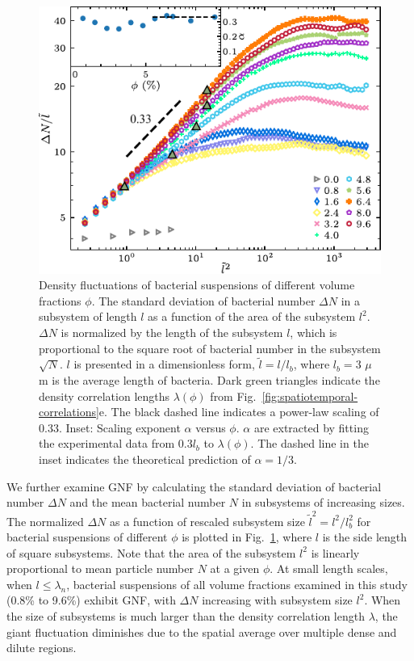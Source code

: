 \begin{figure}[!ht]
\begin{center}
\includegraphics[width=4.5in]{figs/5-GNF/4.pdf}
\caption[Giant Number Fluctuations in Active Turbulence]
{
Density fluctuations of bacterial suspensions of different volume fractions $\phi$. The standard deviation of bacterial number $\Delta N$ in a subsystem of length $l$ as a function of the area of the subsystem $l^2$. $\Delta N$ is normalized by the length of the subsystem $l$, which is proportional to the square root of bacterial number in the subsystem $\sqrt N$. $l$ is presented in a dimensionless form, $\tilde{l} = l/l_b$, where $l_b = 3$ $\mu$m is the average length of bacteria. Dark green triangles indicate the density correlation lengths $\lambda(\phi)$ from Fig.~\ref{fig:spatiotemporal-correlations}e. The black dashed line indicates a power-law scaling of 0.33.
Inset: Scaling exponent $\alpha$ versus $\phi$. $\alpha$ are extracted by fitting the experimental data from 0.3$l_b$ to $\lambda(\phi)$. The dashed line in the inset indicates the theoretical prediction of $\alpha=1/3$.
}
\label{fig:GNF}
\end{center}
\end{figure}

We further examine GNF by calculating the standard deviation of bacterial number $\Delta N$ and the mean bacterial number $N$ in subsystems of increasing sizes. The normalized $\Delta N$ as a function of rescaled subsystem size $\tilde{l}^2=l^2/l_b^2$ for bacterial suspensions of different $\phi$ is plotted in Fig.~\ref{fig:GNF}, where $l$ is the side length of square subsystems.
Note that the area of the subsystem $l^2$ is linearly proportional to mean particle number $N$ at a given $\phi$. At small length scales, when $l\le\lambda_n$, bacterial suspensions of all volume fractions examined in this study (0.8\% to 9.6\%) exhibit GNF, with $\Delta N$ increasing with subsystem size $l^2$. When the size of subsystems is much larger than the density correlation length $\lambda$, the giant fluctuation diminishes due to the spatial average over multiple dense and dilute regions.

